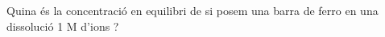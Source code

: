 \begin{exr}{}
Quina és la concentració en equilibri de  si posem una barra de ferro en una dissolució 1 M d'ions ?
\end{exr}

